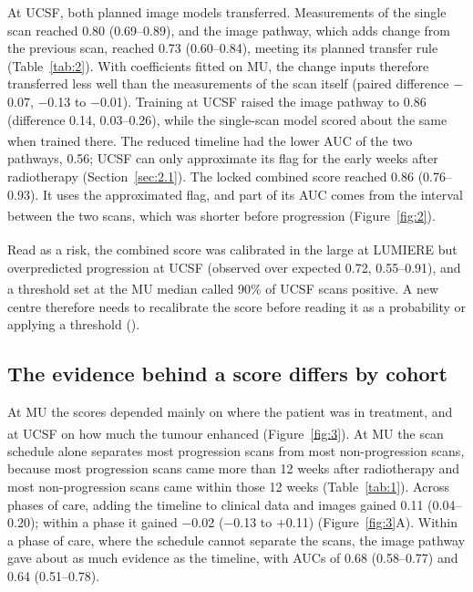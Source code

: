 \documentclass[largeformat]{interact} %
\newcommand{\expl}{\textsuperscript{\textdagger}}
\begin{document}
At UCSF, both planned image models transferred. Measurements of the single scan reached 0.80 (0.69--0.89), and the
image pathway, which adds change from the previous scan, reached 0.73 (0.60--0.84), meeting its planned transfer rule
(Table~\ref{tab:2}). With coefficients fitted on MU, the change inputs therefore transferred less well than the measurements of the scan itself
(paired difference $-$0.07, $-$0.13 to $-$0.01).
Training at UCSF raised the image pathway to 0.86 (difference 0.14, 0.03--0.26), while the single-scan model scored
about the same when trained there\expl. The reduced timeline had the lower AUC of the two pathways, 0.56; UCSF can only approximate its flag for the early
weeks after radiotherapy (Section~\ref{sec:2.1}). The locked combined score reached 0.86 (0.76--0.93). It uses the approximated flag, and part of its AUC comes from
the interval between the two scans, which was shorter before progression\expl{} (Figure~\ref{fig:2}).

Read as a risk, the combined score was calibrated in the large at
LUMIERE\expl{} but overpredicted progression at UCSF (observed over expected 0.72, 0.55--0.91), and a
threshold set at the MU median\expl{} called 90\% of UCSF scans positive. A new centre therefore needs to recalibrate the score
before reading it as a probability or applying a threshold (). 

\subsection{The evidence behind a score differs by cohort}\label{sec:3.3}

At MU the scores depended mainly on where the patient was in treatment, and at UCSF on how much the tumour
enhanced\expl{} (Figure~\ref{fig:3}). At MU the scan schedule alone separates most
progression scans from most non-progression scans, because most progression scans came more than 12 weeks after
radiotherapy and most non-progression scans came within those 12 weeks (Table~\ref{tab:1}). Across phases of care, adding the timeline to clinical data and images gained 0.11
(0.04--0.20); within a phase it gained $-$0.02 ($-$0.13 to $+$0.11) (Figure~\ref{fig:3}A).
Within a phase of care, where the schedule cannot separate the scans, the image pathway gave about as much evidence as
the timeline, with AUCs of 0.68 (0.58--0.77) and 0.64 (0.51--0.78).
\end{document}
